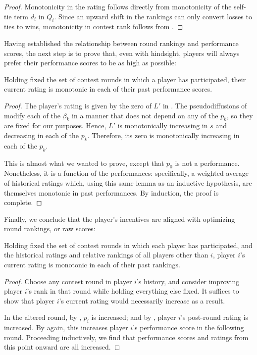 \begin{proof}
Monotonicity in the rating follows directly from monotonicity of the self-tie term $d_i$ in $Q_i$. Since an upward shift in the rankings can only convert losses to ties to wins, monotonicity in contest rank follows from .
\end{proof}

Having established the relationship between round rankings and performance scores, the next step is to prove that, even with hindsight, players will always prefer their performance scores to be as high as possible:

\begin{lemma}
\label{lem:mono-rate}
Holding fixed the set of contest rounds in which a player has participated, their current rating is monotonic in each of their past performance scores.
\end{lemma}

\begin{proof}
The player's rating is given by the zero of $L'$ in . The pseudodiffusions of  modify each of the $\beta_k$ in a manner that does not depend on any of the $p_k$, so they are fixed for our purposes. Hence, $L'$ is monotonically increasing in $s$ and decreasing in each of the $p_k$. Therefore, its zero is monotonically increasing in each of the $p_k$.

This is almost what we wanted to prove, except that $p_0$ is not a performance. Nonetheless, it is a function of the performances: specifically, a weighted average of historical ratings which, using this same lemma as an inductive hypothesis, are themselves monotonic in past performances. By induction, the proof is complete.
\end{proof}

Finally, we conclude that the player's incentives are aligned with optimizing round rankings, or raw scores:

\begin{theorem}
\label{thm:mono}
Holding fixed the set of contest rounds in which each player has participated, and the historical ratings and relative rankings of all players other than $i$, player $i$'s current rating is monotonic in each of their past rankings.
\end{theorem}

\begin{proof}
Choose any contest round in player $i$'s history, and consider improving player $i$'s rank in that round while holding everything else fixed. It suffices to show that player $i$'s current rating would necessarily increase as a result.

In the altered round, by , $p_i$ is increased; and by , player $i$'s post-round rating is increased. By  again, this increases player $i$'s performance score in the following round. Proceeding inductively, we find that performance scores and ratings from this point onward are all increased.
\end{proof}

